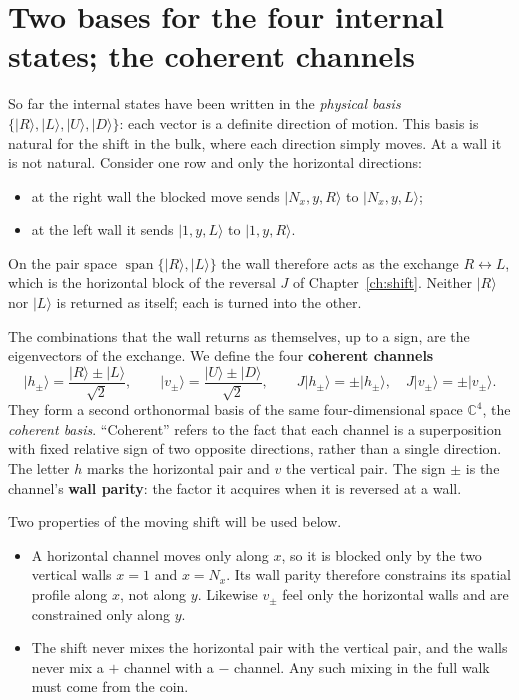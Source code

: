\documentclass[11pt,a4paper,oneside]{report}
\newcommand{\ket}[1]{\lvert #1\rangle}
\newcommand{\spanof}{\operatorname{span}}
\numberwithin{equation}{chapter}
\begin{document}
\section{Two bases for the four internal states; the coherent channels}
\label{sec:panela}

So far the internal states have been written in the \emph{physical basis}
\(\{\ket R,\ket L,\ket U,\ket D\}\): each vector is a definite direction of
motion. This basis is natural for the shift in the bulk, where each
direction simply moves. At a wall it is not natural. Consider one row and
only the horizontal directions:
\begin{itemize}
\item at the right wall the blocked move sends \(\ket{N_x,y,R}\) to
\(\ket{N_x,y,L}\);
\item at the left wall it sends \(\ket{1,y,L}\) to \(\ket{1,y,R}\).
\end{itemize}
On the pair space \(\spanof\{\ket R,\ket L\}\) the wall therefore acts as
the exchange \(R\leftrightarrow L\), which is the horizontal block of the
reversal \(J\) of Chapter~\ref{ch:shift}. Neither \(\ket R\) nor
\(\ket L\) is returned as itself; each is turned into the other.

The combinations that the wall returns as themselves, up to a sign, are
the eigenvectors of the exchange. We define the four \textbf{coherent
channels}
\begin{equation}
\boxed{
\ket{h_\pm}=\frac{\ket R\pm\ket L}{\sqrt2},\qquad
\ket{v_\pm}=\frac{\ket U\pm\ket D}{\sqrt2},\qquad
J\ket{h_\pm}=\pm\ket{h_\pm},\quad J\ket{v_\pm}=\pm\ket{v_\pm}.}
\label{eq:coherentvectors}
\end{equation}
They form a second orthonormal basis of the same four-dimensional space
\(\mathbb C^4\), the \emph{coherent basis}. ``Coherent'' refers to the
fact that each channel is a superposition with fixed relative sign of two
opposite directions, rather than a single direction. The letter \(h\)
marks the horizontal pair and \(v\) the vertical pair. The sign \(\pm\) is
the channel's \textbf{wall parity}: the factor it acquires when it is
reversed at a wall.

Two properties of the moving shift will be used below.
\begin{itemize}
\item A horizontal channel moves only along \(x\), so it is blocked only
by the two vertical walls \(x=1\) and \(x=N_x\). Its wall parity
therefore constrains its spatial profile along \(x\), not along \(y\).
Likewise \(v_\pm\) feel only the horizontal walls and are constrained
only along \(y\).
\item The shift never mixes the horizontal pair with the vertical pair,
and the walls never mix a \(+\) channel with a \(-\) channel. Any such
mixing in the full walk must come from the coin.
\end{itemize}
\end{document}

